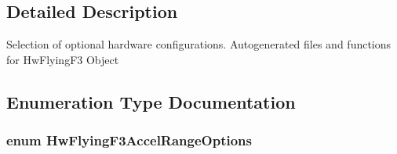\subsection{\-Detailed \-Description}
\-Selection of optional hardware configurations. \-Autogenerated files and functions for \-Hw\-Flying\-F3 \-Object 

\subsection{\-Enumeration \-Type \-Documentation}
\hypertarget{group___hw_flying_f3_ga0b236471af642665e143891f6c284a3e}{
\subsubsection[{\-Hw\-Flying\-F3\-Accel\-Range\-Options}]{\setlength{\rightskip}{0pt plus 5cm}enum {\bf \-Hw\-Flying\-F3\-Accel\-Range\-Options}}}\label{group___hw_flying_f3_ga0b236471af642665e143891f6c284a3e}
